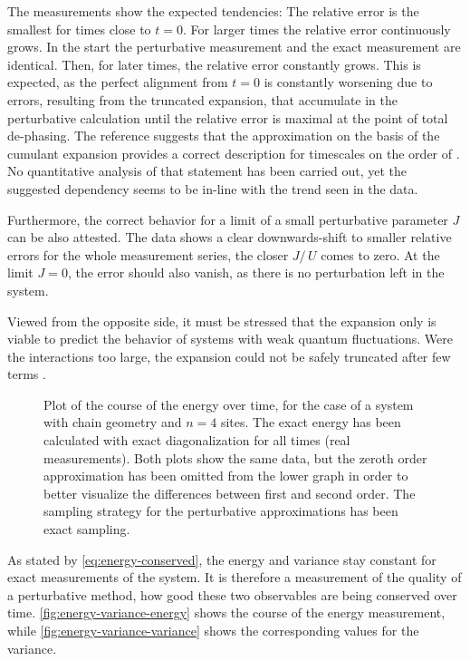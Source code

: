 The measurements show the expected tendencies: The relative error is the smallest for times close to $t=0$. For larger times the relative error continuously grows.
In the start the perturbative measurement and the exact measurement are identical.
Then, for later times, the relative error constantly grows.
This is expected, as the perfect alignment from $t=0$ is constantly worsening due to errors, resulting from the truncated expansion, that accumulate in the perturbative calculation until the relative error is maximal at the point of total de-phasing.
The reference \cite{variationalClassicalNetworksPaper} suggests that the approximation on the basis of the cumulant expansion provides a correct description for timescales on the order of .
No quantitative analysis of that statement has been carried out, yet the suggested dependency seems to be in-line with the trend seen in the data.

Furthermore, the correct behavior for a limit of a small perturbative parameter $J$ can be also attested.
The data shows a clear downwards-shift to smaller relative errors for the whole measurement series, the closer $J/\,U$ comes to zero.
At the limit $J=0$, the error should also vanish, as there is no perturbation left in the system.

Viewed from the opposite side, it must be stressed that the expansion only is viable to predict the behavior of systems with weak quantum fluctuations. 
Were the interactions too large, the expansion could not be safely truncated after few terms \cite{variationalClassicalNetworksPaper}.

\begin{figure}[htbp]
    \centering
    \caption{
            Plot of the course of the energy over time, for the case of a system with chain geometry and $n=4$ sites.
            The exact energy has been calculated with exact diagonalization for all times (real measurements).
            Both plots show the same data, but the zeroth order approximation has been omitted from the lower graph in order to better visualize the differences between first and second order.
            The sampling strategy for the perturbative approximations has been exact sampling.
        }
    \label{fig:energy-variance-energy}
\end{figure}
    
As stated by \autoref{eq:energy-conserved}, the energy and variance stay constant for exact measurements of the system.
It is therefore a measurement of the quality of a perturbative method, how good these two observables are being conserved over time.
\autoref{fig:energy-variance-energy} shows the course of the energy measurement, while \autoref{fig:energy-variance-variance} shows the corresponding values for the variance.

